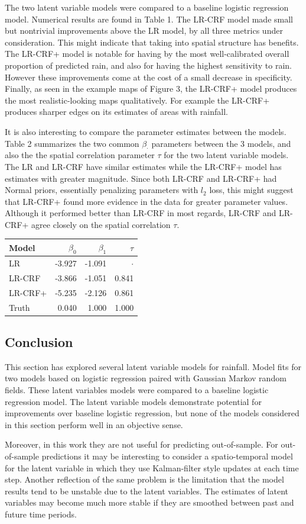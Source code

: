 The two latent variable models were compared to a baseline logistic regression model. Numerical results are found in Table 1. The LR-CRF model made small but nontrivial improvements above the LR model, by all three metrics under consideration. This might indicate that taking into spatial structure has benefits. The LR-CRF+ model is notable for having by the most well-calibrated overall proportion of predicted rain, and also for having the highest sensitivity to rain. However these improvements come at the cost of a small decrease in specificity. Finally, as seen in the example maps of Figure 3, the LR-CRF+ model produces the most realistic-looking maps qualitatively. For example the LR-CRF+ produces sharper edges on its estimates of areas with rainfall.

It is also interesting to compare the parameter estimates between the models. Table 2 summarizes the two common $\beta_\cdot$ parameters between the 3 models, and also the the spatial correlation parameter $\tau$ for the two latent variable models. The LR and LR-CRF have similar estimates while the LR-CRF+ model has estimates with greater magnitude. Since both LR-CRF and LR-CRF+ had Normal priors, essentially penalizing parameters with $l_2$ loss, this might suggest that LR-CRF+ found more evidence in the data for greater parameter values. Although it performed better than LR-CRF in most regards, LR-CRF and LR-CRF+ agree closely on the spatial correlation $\tau$. 

\begin{table}[ht]
\centering
\begin{tabular}{lrrr}
  \hline
Model & $\beta_0$ & $\beta_1$ & $\tau$ \\ 
  \hline
LR & -3.927 & -1.091 & $\cdot$ \\ 
LR-CRF & -3.866 & -1.051 & 0.841 \\ 
LR-CRF+ & -5.235 & -2.126  &  0.861 \\ 
   \hline
   Truth & 0.040 & 1.000 & 1.000
\end{tabular}
\end{table}

\subsection{Conclusion}
This section has explored several latent variable models for rainfall. Model fits for two models based on logistic regression paired with Gaussian Markov random fields. These latent variables models were compared to a baseline logistic regression model. The latent variable models demonstrate potential for improvements over baseline logistic regression, but none of the models considered in this section perform well in an objective sense.

Moreover, in this work they are not useful for predicting out-of-sample. For out-of-sample predictions it may be interesting to consider a spatio-temporal model for the latent variable in which they use Kalman-filter style updates at each time step. Another reflection of the same problem is the limitation that the model results tend to be unstable due to the latent variables. The estimates of latent variables may become much more stable if they are smoothed between past and future time periods.